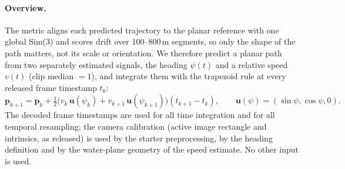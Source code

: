 \documentclass[11pt]{article}
\begin{document}
\paragraph{Overview.}
The metric aligns each predicted trajectory to the planar reference with one global Sim(3) and scores drift
over 100--800\,m segments, so only the shape of the path matters, not its scale or orientation. We therefore
predict a planar path from two separately estimated signals, the heading $\psi(t)$ and a relative speed
$v(t)$ (clip median $=1$), and integrate them with the trapezoid rule at every released frame timestamp $t_k$:
\begin{equation}
  \mathbf p_{k+1} = \mathbf p_k + \tfrac12\bigl(v_k\,\mathbf u(\psi_k) + v_{k+1}\,\mathbf u(\psi_{k+1})\bigr)(t_{k+1}-t_k),
  \qquad \mathbf u(\psi) = (\sin\psi, \cos\psi, 0).
\end{equation}
The decoded frame timestamps are used for all time integration and for all temporal resampling; the camera
calibration (active image rectangle and intrinsics, as released) is used by the starter preprocessing, by the
heading definition and by the water-plane geometry of the speed estimate. No other input is used.
\end{document}
